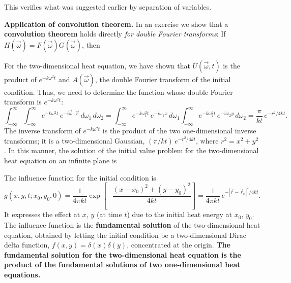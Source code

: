 This verifies what was suggested earlier by separation of variables.

\textbf{Application of convolution theorem.}  In an exercise we show that a \textbf{convolution theorem} holds directly \textit{for double Fourier transforms}: If $H(\vec{\omega}) = F(\vec{\omega})G(\vec{\omega})$, then

For the two-dimensional heat equation, we have shown that $\overline{U}(\vec{\omega},t)$ is the product of $e^{-k\omega^2 t}$ and $A(\vec{\omega})$, the double Fourier transform of the initial condition.  Thus, we need to determine the function whose double Fourier transform is $e^{-k\omega^2 t}$:
\[
\int_{-\infty}^{\infty}\int_{-\infty}^{\infty}e^{-k\omega^2 t}\,e^{-i\vec{\omega}\cdot\vec{r}}\,d\omega_1\,d\omega_2 = \int_{-\infty}^{\infty}e^{-k\omega_1^2 t}\,e^{-i\omega_1 x}\,d\omega_1\int_{-\infty}^{\infty}e^{-k\omega_2^2 t}\,e^{-i\omega_2 y}\,d\omega_2 = \frac{\pi}{kt}\,e^{-r^2/4kt}.
\]
The inverse transform of $e^{-k\omega^2 t}$ is the product of the two one-dimensional inverse transforms; it is a two-dimensional Gaussian, $(\pi/kt)\,e^{-r^2/4kt}$, where $r^2 = x^2+y^2$.  In this manner, the solution of the initial value problem for the two-dimensional heat equation on an infinite plane is

The influence function for the initial condition is
\[
g(x,y,t;x_0,y_0,0) = \frac{1}{4\pi kt}\exp\left[-\frac{(x-x_0)^2+(y-y_0)^2}{4kt}\right] = \frac{1}{4\pi kt}\,e^{-|\vec{r}-\vec{r}_0|^2/4kt}.
\]
It expresses the effect at $x$, $y$ (at time $t$) due to the initial heat energy at $x_0$, $y_0$.  The influence function is the \textbf{fundamental solution} of the two-dimensional heat equation, obtained by letting the initial condition be a two-dimensional Dirac delta function, $f(x,y) = \delta(x)\delta(y)$, concentrated at the origin.  \textbf{The fundamental solution for the two-dimensional heat equation is the product of the fundamental solutions of two one-dimensional heat equations.}

